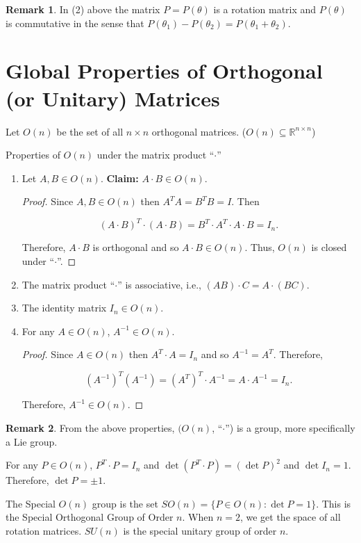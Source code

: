 \documentclass[12pt]{article}
\theoremstyle{definition}
\newtheorem*{remark}{Remark}
\begin{document}
\begin{remark}
In (2) above the matrix $P = P(\theta)$ is a rotation matrix and $P(\theta)$ is commutative
in the sense that $P(\theta_1) - P(\theta_2) = P(\theta_1 + \theta_2)$.
\end{remark}

\section{Global Properties of Orthogonal (or Unitary) Matrices}

Let $O(n)$ be the set of all $n \times n$ orthogonal matrices. 
($O(n) \subseteq \mathbb{R}^{n \times n}$)

\vspace{0.5cm}

\noindent Properties of $O(n)$ under the matrix product ``$\cdot$''
\begin{enumerate}[label = (\arabic*)] 
\item Let $A, B \in O(n)$. \textbf{Claim:} $A \cdot B \in O(n)$.
\begin{proof}
Since $A, B \in O(n)$ then $A^TA = B^TB = I$. Then 

\[ (A \cdot B)^T \cdot (A \cdot B) = B^T \cdot A^T \cdot A \cdot B = I_n.\]

Therefore, $A \cdot B$ is orthogonal and so $A \cdot B \in O(n)$. Thus,
$O(n)$ is closed under ``$\cdot$''.
\end{proof}
\item The matrix product ``$\cdot$'' is associative, i.e., $(AB) \cdot C = A \cdot (BC)$.
\item The identity matrix $I_n \in O(n)$.
\item For any $A \in O(n)$, $A^{-1} \in O(n)$.

\begin{proof}
Since $A \in O(n)$ then $A^T \cdot A = I_n$ and so $A^{-1} = A^T$. Therefore,

\[(A^{-1})^T (A^{-1}) = (A^T)^T \cdot A^{-1} = A \cdot A^{-1} = I_n. \]

Therefore, $A^{-1} \in O(n)$.
\end{proof}
\end{enumerate}

\begin{remark}
From the above properties, $(O(n)$, ``$\cdot$'') is a group, more specifically a Lie group.

For any $P \in O(n)$, $P^T \cdot P = I_n$ and $\det (P^T \cdot P) = (\det P)^2$ and
$\det I_n = 1$. Therefore, $\det P = \pm 1$.

The Special $O(n)$ group is the set $SO(n) = \{P \in O(n) : \det P = 1\}$. This is the
Special Orthogonal Group of Order $n$. When $n = 2$, we get the space of all rotation
matrices. $SU(n)$ is the special unitary group of order $n$.
\end{remark}
\end{document}
